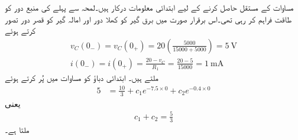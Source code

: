 مساوات کے مستقل حاصل کرنے کے لیے ابتدائی معلومات درکار ہیں۔لمحہ  سے پہلے  کی منبع دور کو طاقت فراہم کر رہی تھی۔اس برقرار صورت میں برق گیر کو کھلا دور اور امالہ گیر کو قصر دور تصور کرتے ہوئے
\begin{align*}
v_C(0_-)=v_C(0_+)=20 \left(\frac{5000}{15000+5000}\right)=\SI{5}{\volt}\\
i(0_-)=i(0_+)=\frac{20-v_C}{R_1}=\frac{20-5}{15000}=\SI{1}{\milli\ampere}
\end{align*}
ملتے ہیں۔ ابتدائی دباؤ کو مساوات  میں پُر کرتے ہوئے
  \begin{align*}
5&=\frac{10}{3}+c_1 e^{-7.5\times 0}+c_2e^{-0.4\times 0}
\end{align*}
یعنی
\begin{align}\label{مساوات_عارضی_مستقل_مثال_دس_الف}
c_1+c_2=\frac{5}{3}
\end{align}
ملتا ہے۔

